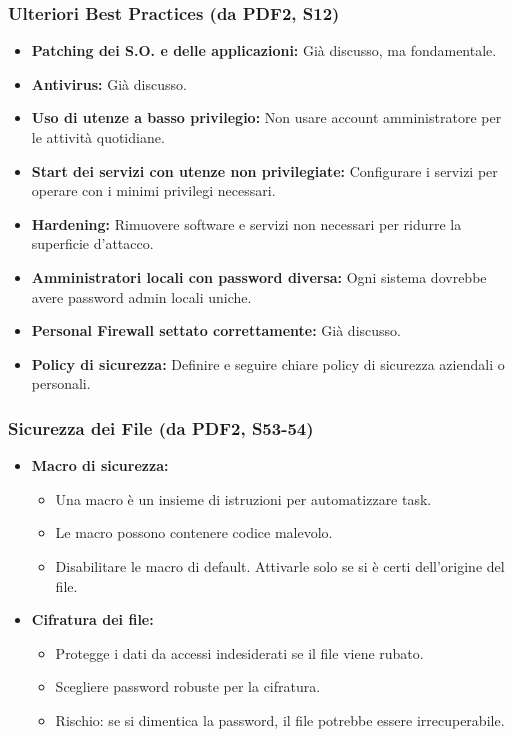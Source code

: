 \documentclass{beamer}
\begin{document}
\begin{frame}
    \frametitle{Ulteriori Best Practices (da PDF2, S12)}
    \begin{itemize}
        \item \textbf{Patching dei S.O. e delle applicazioni:} Già discusso, ma fondamentale.
        \item \textbf{Antivirus:} Già discusso.
        \item \textbf{Uso di utenze a basso privilegio:} Non usare account amministratore per le attività quotidiane.
        \item \textbf{Start dei servizi con utenze non privilegiate:} Configurare i servizi per operare con i minimi privilegi necessari.
        \item \textbf{Hardening:} Rimuovere software e servizi non necessari per ridurre la superficie d'attacco.
        \item \textbf{Amministratori locali con password diversa:} Ogni sistema dovrebbe avere password admin locali uniche.
        \item \textbf{Personal Firewall settato correttamente:} Già discusso.
        \item \textbf{Policy di sicurezza:} Definire e seguire chiare policy di sicurezza aziendali o personali.
    \end{itemize}
\end{frame}

\begin{frame}
    \frametitle{Sicurezza dei File (da PDF2, S53-54)}
    \begin{itemize}
        \item \textbf{Macro di sicurezza:}
            \begin{itemize}
                \item Una macro è un insieme di istruzioni per automatizzare task.
                \item Le macro possono contenere codice malevolo.
                \item Disabilitare le macro di default. Attivarle solo se si è certi dell'origine del file.
            \end{itemize}
        \item \textbf{Cifratura dei file:}
            \begin{itemize}
                \item Protegge i dati da accessi indesiderati se il file viene rubato.
                \item Scegliere password robuste per la cifratura.
                \item Rischio: se si dimentica la password, il file potrebbe essere irrecuperabile.
            \end{itemize}
    \end{itemize}
\end{frame}
\end{document}
